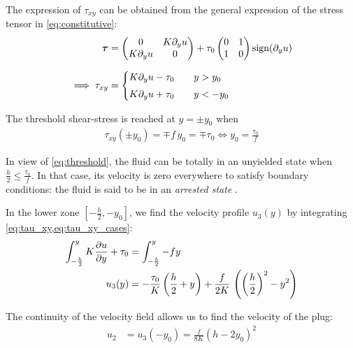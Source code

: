 \documentclass[11 pt]{report}
\begin{document}
The expression of $\tau_{xy}$ can be obtained from the general expression of the stress tensor in \eqref{eq:constitutive}:
\begin{align}
    \boldsymbol{\tau} &=
    \begin{pmatrix}
        0 & K \partial_y u\\
        K \partial_y u & 0\\
    \end{pmatrix} + \tau_0
    \begin{pmatrix}
        0 & 1\\
        1 & 0\\
    \end{pmatrix} \sign(\partial_y u) \\[6pt] %
    \implies \tau_{xy} &=
    \begin{cases}
        K \partial_y u - \tau_0  \qquad y > y_0\\[3pt]
        K \partial_y u + \tau_0  \qquad y < -y_0\\
    \end{cases} \label{eq:tau_xy_cases}
\end{align}

The threshold shear-stress is reached at $y=\pm y_0$ when 
\begin{align}
    \tau_{xy}(\pm y_0) = \mp f \, y_0 = \mp \tau_0 \iff y_0 = \frac{\tau_0}{f} \label{eq:threshold}
\end{align}

In view of \eqref{eq:threshold}, the fluid can be totally in an unyielded state when $\frac{h}{2} \leq \frac{\tau_0}{f}$. In that case, its velocity is zero everywhere to satisfy boundary conditions: the fluid is said to be in an \textit{arrested state} \cite{saramito2016complex}.

In the lower zone $[-\frac{h}{2}, -y_0]$, we find the velocity profile $u_3(y)$ by integrating \cref{eq:tau_xy,eq:tau_xy_cases}:
\begin{align}
    \int_{-\frac{h}{2}}^y K \pdv{u}{y} + \tau_0 &= \int_{-\frac{h}{2}}^y -f y\\
    u_3(y) &= -\frac{\tau_0}{K} \left(\frac{h}{2}+y\right) + \frac{f}{2K} \, \left(\left(\frac{h}{2}\right)^2 - y^2\right)
\end{align}

The continuity of the velocity field allows us to find the velocity of the plug:
\begin{align}
    u_2 &= u_3(-y_0) = %
    \frac{f}{8K} \left(h - 2y_0\right)^2
\end{align}
\end{document}
